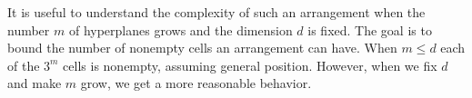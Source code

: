It is useful to understand the complexity of such an arrangement when
the number \(m\) of hyperplanes grows and the dimension \(d\) is fixed.
The goal is to bound the number of nonempty cells an arrangement
can have. When \(m \leq d\) each of the \(3^m\) cells is nonempty, assuming
general position. However, when we fix \(d\) and make \(m\) grow, we get a more
reasonable behavior.
%

